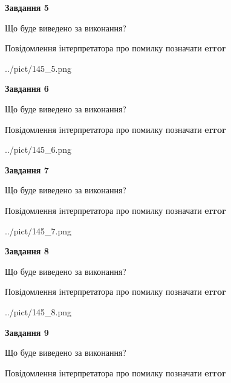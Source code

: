 \documentclass[11pt, ukrainian]{article}
\begin{document}
{\begin {large}
{\begin {center}\textbf{Завдання 5}\end {center}}\par
Що буде виведено за виконання? \par
Повідомлення інтерпретатора про помилку позначати \textbf{error}

\begin{center}
	{../pict/145_5.png}
\end{center}
\newpage

{\begin {center}\textbf{Завдання 6}\end {center}}\par
Що буде виведено за виконання? \par
Повідомлення інтерпретатора про помилку позначати \textbf{error}

\begin{center}
	{../pict/145_6.png}
\end{center}
\newpage

{\begin {center}\textbf{Завдання 7}\end {center}}\par
Що буде виведено за виконання? \par
Повідомлення інтерпретатора про помилку позначати \textbf{error}

\begin{center}
	{../pict/145_7.png}
\end{center}
\newpage

{\begin {center}\textbf{Завдання 8}\end {center}}\par
Що буде виведено за виконання? \par
Повідомлення інтерпретатора про помилку позначати \textbf{error}

\begin{center}
	{../pict/145_8.png}
\end{center}
\newpage

{\begin {center}\textbf{Завдання 9}\end {center}}\par
Що буде виведено за виконання? \par
Повідомлення інтерпретатора про помилку позначати \textbf{error}


\end{large}}
\end{document}
